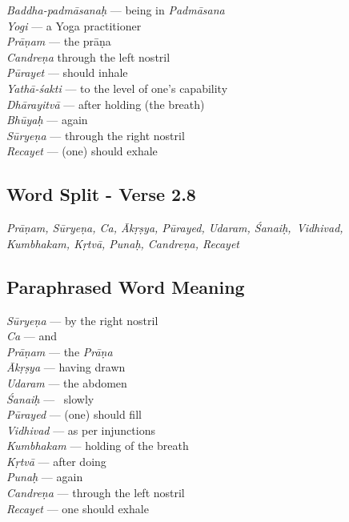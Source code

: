 \begin{multicols}{2}
\textit{Baddha-padmāsanaḥ} --- being in \textit{Padmāsana} \\
\textit{Yogi} --- a Yoga practitioner \\
\textit{Prāṇam} --- the prāṇa \\
\textit{Candreṇa}  through the left nostril \\
\textit{Pūrayet} --- should inhale \\
\textit{Yathā-śakti} --- to the level of one’s capability \\
\textit{Dhārayitvā} --- after holding (the breath)\\
\textit{Bhūyaḥ} --- again \\
\textit{Sūryeṇa} --- through the right nostril \\
\textit{Recayet} --- (one) should exhale 
\end{multicols}

\subsection*{Word Split - Verse 2.8}


\textit{Prāṇam, Sūryeṇa, Ca, Ākṛṣya, Pūrayed, Udaram, Śanaiḥ, Vidhivad, Kumbhakam, Kṛtvā, Punaḥ, Candreṇa, Recayet}

\subsection*{Paraphrased Word Meaning}


\begin{multicols}{2}
\textit{Sūryeṇa} --- by the right nostril \\
\textit{Ca} --- and \\
\textit{Prāṇam} --- the \textit{Prāṇa} \\
\textit{Ākṛṣya} --- having drawn \\
\textit{Udaram} --- the abdomen \\
\textit{Śanaiḥ} ---  slowly \\
\textit{Pūrayed} --- (one) should fill \\
\textit{Vidhivad} --- as per injunctions \\
\textit{Kumbhakam} --- holding of the breath\\
\textit{Kṛtvā} --- after doing \\
\textit{Punaḥ} --- again \\
\textit{Candreṇa} --- through the left nostril \\
\textit{Recayet} --- one should exhale
\end{multicols}

